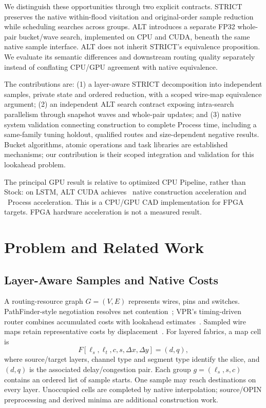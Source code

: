 \documentclass[conference,10pt,letterpaper]{IEEEtran}
\begin{document}
We distinguish these opportunities through two explicit contracts. STRICT preserves the native within-flood visitation and original-order sample reduction while scheduling searches across groups. ALT introduces a separate FP32 whole-pair bucket/wave search, implemented on CPU and CUDA, beneath the same native sample interface. ALT does not inherit STRICT's equivalence proposition. We evaluate its semantic differences and downstream routing quality separately instead of conflating CPU/GPU agreement with native equivalence.

The contributions are: (1) a layer-aware STRICT decomposition into independent samples, private state and ordered reduction, with a scoped wire-map equivalence argument; (2) an independent ALT search contract exposing intra-search parallelism through snapshot waves and whole-pair updates; and (3) native system validation connecting construction to complete Process time, including a same-family tuning holdout, qualified routes and size-dependent negative results. Bucket algorithms, atomic operations and task libraries are established mechanisms; our contribution is their scoped integration and validation for this lookahead problem.

The principal GPU result is relative to optimized CPU Pipeline, rather than Stock: on LSTM, ALT CUDA achieves \LstmPipeBuild\ native construction acceleration and \LstmPipeProc\ Process acceleration. This is a CPU/GPU CAD implementation for FPGA targets. FPGA hardware acceleration is not a measured result.

\section{Problem and Related Work}
\subsection{Layer-Aware Samples and Native Costs}
A routing-resource graph $G=(V,E)$ represents wires, pins and switches. PathFinder-style negotiation resolves net contention~\cite{pathfinder}; VPR's timing-driven router combines accumulated costs with lookahead estimates~\cite{vtr8,vtr9}. Sampled wire maps retain representative costs by displacement~\cite{diversity}. For layered fabrics, a map cell is
\begin{equation}
F[\ell_s,\ell_t,c,s,\Delta x,\Delta y]=(d,q),
\end{equation}
where source/target layers, channel type and segment type identify the slice, and $(d,q)$ is the associated delay/congestion pair. Each group $g=(\ell_s,s,c)$ contains an ordered list of sample starts. One sample may reach destinations on every layer. Unoccupied cells are completed by native interpolation; source/OPIN preprocessing and derived minima are additional construction work.
\end{document}

